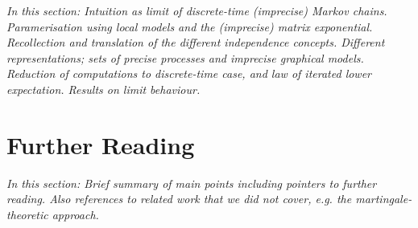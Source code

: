 \documentclass[graybox]{svmult}
\begin{document}
\emph{In this section: Intuition as limit of discrete-time (imprecise) Markov chains. Paramerisation using local models and the (imprecise) matrix exponential. Recollection and translation of the different independence concepts. Different representations; sets of precise processes and imprecise graphical models. Reduction of computations to discrete-time case, and law of iterated lower expectation. Results on limit behaviour.}

\section{Further Reading}

\emph{In this section: Brief summary of main points including pointers to further reading. Also references to related work that we did not cover, e.g. the martingale-theoretic approach.}
\end{document}
